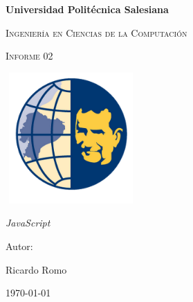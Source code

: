 \documentclass{report}
\begin{document}
\begin{titlepage}
\centering
{\bfseries\LARGE Universidad Politécnica Salesiana \par}
\vspace{1cm}
{\scshape\Large Ingeniería en Ciencias de la Computación \par}
\vspace{3cm}
{\scshape\Huge Informe 02 \par}
\vspace{1cm}
{\center\includegraphics[width=5cm, height=5cm]{ups1.png}\\}
\vspace{1cm}
{\itshape\Large JavaScript \par}
\vfill
{\Large Autor: \par}
{\Large Ricardo Romo \par}
\vfill
{\Large \today \par}
\end{titlepage}
\tableofcontents
\end{document}
